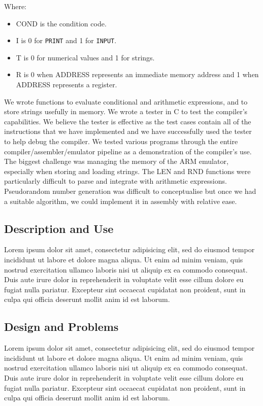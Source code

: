 \documentclass[11pt, letterpaper]{article}
\begin{document}
Where:
\begin{itemize}
\item COND is the condition code.
\item I is 0 for \verb|PRINT| and 1 for \verb|INPUT|.
\item T is 0 for numerical values and 1 for strings.
\item R is 0 when ADDRESS represents an immediate memory address and 1 when ADDRESS represents a register.
\end{itemize}

We wrote functions to evaluate conditional and arithmetic expressions, and to store strings usefully in memory. We wrote a tester in C to test the compiler's capabilities. We believe the tester is effective as the test cases contain all of the instructions that we have implemented and we have successfully used the tester to help debug the compiler. We tested various programs through the entire compiler/assembler/emulator pipeline as a demonstration of the compiler's use.
The biggest challenge was managing the memory of the ARM emulator, especially when storing and loading strings. The LEN and RND functions were particularly difficult to parse and integrate with arithmetic expressions. Pseudorandom number generation was difficult to conceptualise but once we had a suitable algorithm, we could implement it in assembly with relative ease.

\subsection{Description and Use}
Lorem ipsum dolor sit amet, consectetur adipisicing elit, sed do eiusmod tempor
incididunt ut labore et dolore magna aliqua. Ut enim ad minim veniam, quis
nostrud exercitation ullamco laboris nisi ut aliquip ex ea commodo consequat.
Duis aute irure dolor in reprehenderit in voluptate velit esse cillum dolore eu
fugiat nulla pariatur. Excepteur sint occaecat cupidatat non proident, sunt in
culpa qui officia deserunt mollit anim id est laborum.

\subsection{Design and Problems}
Lorem ipsum dolor sit amet, consectetur adipisicing elit, sed do eiusmod tempor
incididunt ut labore et dolore magna aliqua. Ut enim ad minim veniam, quis
nostrud exercitation ullamco laboris nisi ut aliquip ex ea commodo consequat.
Duis aute irure dolor in reprehenderit in voluptate velit esse cillum dolore eu
fugiat nulla pariatur. Excepteur sint occaecat cupidatat non proident, sunt in
culpa qui officia deserunt mollit anim id est laborum.
\end{document}
